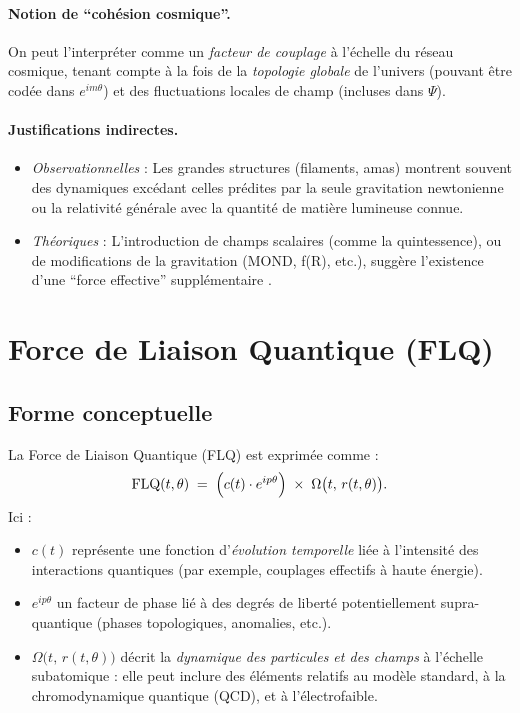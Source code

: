 \documentclass[12pt]{article}
\begin{document}
\paragraph{Notion de ``cohésion cosmique''.}
On peut l'interpréter comme un \emph{facteur de couplage} à l'échelle du réseau cosmique, 
tenant compte à la fois de la \emph{topologie globale} de l'univers (pouvant être codée 
dans $e^{i m \theta}$) et des fluctuations locales de champ (incluses dans $\Psi$).

\paragraph{Justifications indirectes.}
\begin{itemize}
    \item \emph{Observationnelles} : Les grandes structures (filaments, amas) 
          montrent souvent des dynamiques excédant celles prédites par la seule gravitation 
          newtonienne ou la relativité générale avec la quantité de matière lumineuse connue.
    \item \emph{Théoriques} : L'introduction de champs scalaires (comme la quintessence), 
          ou de modifications de la gravitation (MOND, f(R), etc.), suggère 
          l'existence d'une ``force effective'' supplémentaire \cite{carroll2004spacetime}.
\end{itemize}

\section{Force de Liaison Quantique (FLQ)}

\subsection{Forme conceptuelle}

La Force de Liaison Quantique (FLQ) est exprimée comme :
\begin{equation}
\label{eq:FLQ}
\mathrm{FLQ}(t,\theta) 
\;=\; \Bigl(c(t)\cdot e^{i p \theta}\Bigr)\;\times\;\Omega\bigl(t,\,r(t,\theta)\bigr).
\end{equation}
Ici :
\begin{itemize}
    \item $c(t)$ représente une fonction d'\emph{évolution temporelle} 
          liée à l'intensité des interactions quantiques (par exemple, couplages effectifs 
          à haute énergie).
    \item $e^{i p \theta}$ un facteur de phase lié à des degrés de liberté 
          potentiellement supra-quantique (phases topologiques, anomalies, etc.).
    \item $\Omega\bigl(t,\,r(t,\theta)\bigr)$ décrit la \emph{dynamique des particules 
          et des champs} à l'échelle subatomique : elle peut inclure des éléments relatifs 
          au modèle standard, à la chromodynamique quantique (QCD), et à l'électrofaible.
\end{itemize}
\end{document}

